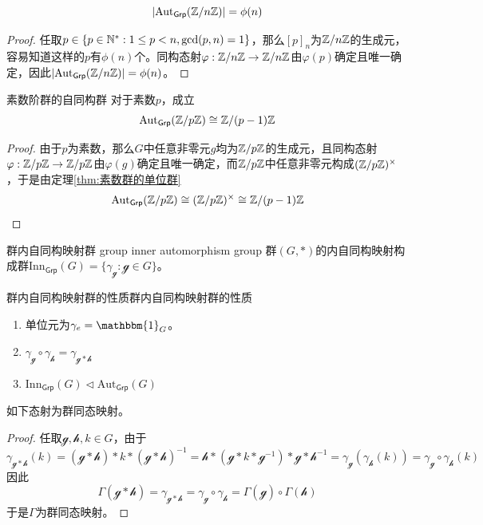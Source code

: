 \begin{proposition}
	\[ 
	|\mathrm{Aut}_{\mathsf{Grp}}(\mathbb{Z}/n\mathbb{Z})|=\phi(n)
	 \]
\end{proposition}

\begin{proof}
	任取$p\in\{ p\in\mathbb{N}^*:1\le p<n,\mathrm{gcd}(p,n)=1 \}$，那么$[p]_n$为$\mathbb{Z}/n\mathbb{Z}$的生成元，容易知道这样的$p$有$\phi(n)$个。同构态射$\varphi:\mathbb{Z}/n\mathbb{Z}\to \mathbb{Z}/n\mathbb{Z}$由$\varphi(p)$确定且唯一确定，因此$|\mathrm{Aut}_{\mathsf{Grp}}(\mathbb{Z}/n\mathbb{Z})|=\phi(n)$。
\end{proof}

\begin{proposition}{}{素数阶群的自同构群}
	对于素数$p$，成立
	\[ 
	\mathrm{Aut}_{\mathsf{Grp}}(\mathbb{Z}/p\mathbb{Z})\cong \mathbb{Z}/(p-1)\mathbb{Z}
	 \]
\end{proposition}

\begin{proof}
	由于$p$为素数，那么$G$中任意非零元$g$均为$\mathbb{Z}/p\mathbb{Z}$的生成元，且同构态射$\varphi:\mathbb{Z}/p\mathbb{Z}\to \mathbb{Z}/p\mathbb{Z}$由$\varphi(g)$确定且唯一确定，而$\mathbb{Z}/p\mathbb{Z}$中任意非零元构成$(\mathbb{Z}/p\mathbb{Z})^{\times}$，于是由定理\ref{thm:素数群的单位群}
	\[ 
	\mathrm{Aut}_{\mathsf{Grp}}(\mathbb{Z}/p\mathbb{Z})
	\cong(\mathbb{Z}/p\mathbb{Z})^{\times}
	\cong \mathbb{Z}/(p-1)\mathbb{Z}
	 \]
\end{proof}

\begin{definition}{群内自同构映射群 group inner automorphism group}
	群$(G,*)$的内自同构映射构成群$\mathrm{Inn}_{\mathsf{Grp}}(G)=\{ \gamma_\mathcal{g}:\mathcal{g}\in G \}$。
\end{definition}

\begin{proposition}{群内自同构映射群的性质}{群内自同构映射群的性质}
	\begin{enumerate}
		\item 单位元为$\gamma_{e}=\mathbbm{1}_G$。
		\item $\gamma_{\mathcal{g}}\circ \gamma_{\mathcal{h}}=\gamma_{\mathcal{g}*\mathcal{h}}$
		\item $\mathrm{Inn}_{\mathsf{Grp}}(G)\lhd \mathrm{Aut}_{\mathsf{Grp}}(G)$
	\end{enumerate}
\end{proposition}

\begin{proposition}
	如下态射为群同态映射。
\end{proposition}

\begin{proof}
	任取$\mathcal{g},\mathcal{h},k\in G$，由于
	\[ \gamma_{\mathcal{g*h}}(k)
	=(\mathcal{g*h})*k*(\mathcal{g*h})^{-1}
	=\mathcal{h}*(\mathcal{g}*k*\mathcal{g}^{-1})*\mathcal{g*h}^{-1}
	=\gamma_{\mathcal{g}}( \gamma_{\mathcal{h}}(k))=\gamma_{\mathcal{g}}\circ \gamma_{\mathcal{h}}(k)
	\]
	因此
	\[ \Gamma(\mathcal{g}*\mathcal{h})=\gamma_{\mathcal{g*h}}=\gamma_{\mathcal{g}}\circ \gamma_{\mathcal{h}}=\Gamma(\mathcal{g})\circ\Gamma(\mathcal{h})
	\]
	于是$\Gamma$为群同态映射。
\end{proof}


